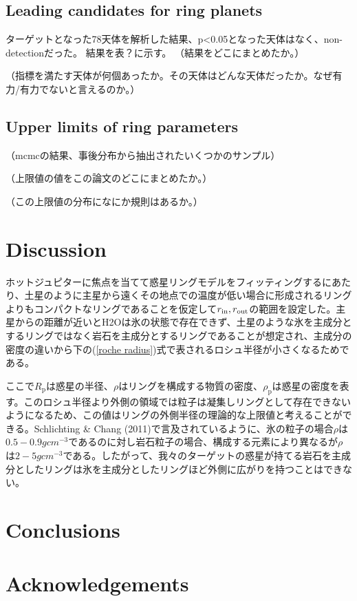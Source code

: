 \documentclass[fleqn,usenatbib, onecolumn,dvipdfmx]{mnras}
\begin{document}
\subsection{Leading candidates for ring planets}
ターゲットとなった78天体を解析した結果、p<0.05となった天体はなく、non-detectionだった。
結果を表？に示す。
（結果をどこにまとめたか。）

（指標を満たす天体が何個あったか。その天体はどんな天体だったか。なぜ有力/有力でないと言えるのか。）
\subsection{Upper limits of ring parameters }
（mcmcの結果、事後分布から抽出されたいくつかのサンプル）

（上限値の値をこの論文のどこにまとめたか。）

（この上限値の分布になにか規則はあるか。）

\section{Discussion}
ホットジュピターに焦点を当てて惑星リングモデルをフィッティングするにあたり、土星のように主星から遠くその地点での温度が低い場合に形成されるリングよりもコンパクトなリングであることを仮定して$r_{\rm{in}},r_{\rm{out}}$の範囲を設定した。主星からの距離が近いとH2Oは氷の状態で存在できず、土星のような氷を主成分とするリングではなく岩石を主成分とするリングであることが想定され、主成分の密度の違いから下の(\ref{roche radius})式で表されるロシュ半径が小さくなるためである。

ここで$R_{\mathrm{p}}$は惑星の半径、$\rho$はリングを構成する物質の密度、$\rho_{\mathrm{p}}$は惑星の密度を表す。このロシュ半径より外側の領域では粒子は凝集しリングとして存在できないようになるため、この値はリングの外側半径の理論的な上限値と考えることができる。Schlichting \& Chang (2011)で言及されているように、氷の粒子の場合$\rho$は$0.5-0.9g cm^{-3}$であるのに対し岩石粒子の場合、構成する元素により異なるが$\rho$は$2-5g cm^{-3}$である。したがって、我々のターゲットの惑星が持てる岩石を主成分としたリングは氷を主成分としたリングほど外側に広がりを持つことはできない。

\section{Conclusions}


\section*{Acknowledgements}
\end{document}
